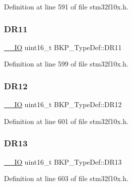 Definition at line 591 of file stm32f10x.\+h.

\mbox{\label{struct_b_k_p___type_def_af0938123a38313da403033b8f8d7bc5c}} 
\subsubsection{\texorpdfstring{D\+R11}{DR11}}
{\footnotesize\ttfamily \hyperlink{core__sc300_8h_aec43007d9998a0a0e01faede4133d6be}{\+\_\+\+\_\+\+IO} uint16\+\_\+t B\+K\+P\+\_\+\+Type\+Def\+::\+D\+R11}



Definition at line 599 of file stm32f10x.\+h.

\mbox{\label{struct_b_k_p___type_def_ab41da40ac09242ce3e9779e1634048be}} 
\subsubsection{\texorpdfstring{D\+R12}{DR12}}
{\footnotesize\ttfamily \hyperlink{core__sc300_8h_aec43007d9998a0a0e01faede4133d6be}{\+\_\+\+\_\+\+IO} uint16\+\_\+t B\+K\+P\+\_\+\+Type\+Def\+::\+D\+R12}



Definition at line 601 of file stm32f10x.\+h.

\mbox{\label{struct_b_k_p___type_def_a0ab16642a837425a410058ce4295b208}} 
\subsubsection{\texorpdfstring{D\+R13}{DR13}}
{\footnotesize\ttfamily \hyperlink{core__sc300_8h_aec43007d9998a0a0e01faede4133d6be}{\+\_\+\+\_\+\+IO} uint16\+\_\+t B\+K\+P\+\_\+\+Type\+Def\+::\+D\+R13}



Definition at line 603 of file stm32f10x.\+h.

\mbox{\label{struct_b_k_p___type_def_aa925753417b767820db2ff1fa87d0c86}} 
